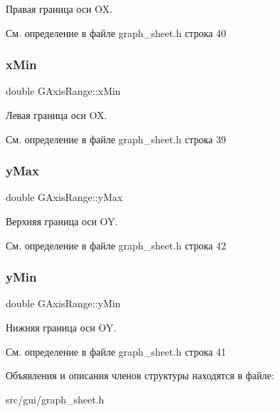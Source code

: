 Правая граница оси OX. 

См. определение в файле graph\+\_\+sheet.\+h строка 40

\hypertarget{struct_g_axis_range_a01a9d0fa30092286df72949de7da0d1f}{}\label{struct_g_axis_range_a01a9d0fa30092286df72949de7da0d1f} 
\subsubsection{\texorpdfstring{x\+Min}{xMin}}
{\footnotesize\ttfamily double G\+Axis\+Range\+::x\+Min}

Левая граница оси OX. 

См. определение в файле graph\+\_\+sheet.\+h строка 39

\hypertarget{struct_g_axis_range_a4b2aad8d5fd79b13d555b278ca3b2fb2}{}\label{struct_g_axis_range_a4b2aad8d5fd79b13d555b278ca3b2fb2} 
\subsubsection{\texorpdfstring{y\+Max}{yMax}}
{\footnotesize\ttfamily double G\+Axis\+Range\+::y\+Max}

Верхняя граница оси OY. 

См. определение в файле graph\+\_\+sheet.\+h строка 42

\hypertarget{struct_g_axis_range_abc64e1b37194dc086641670a92c62837}{}\label{struct_g_axis_range_abc64e1b37194dc086641670a92c62837} 
\subsubsection{\texorpdfstring{y\+Min}{yMin}}
{\footnotesize\ttfamily double G\+Axis\+Range\+::y\+Min}

Нижняя граница оси OY. 

См. определение в файле graph\+\_\+sheet.\+h строка 41



Объявления и описания членов структуры находятся в файле\+:\begin{DoxyCompactItemize}
\item 
src/gui/graph\+\_\+sheet.\+h\end{DoxyCompactItemize}

